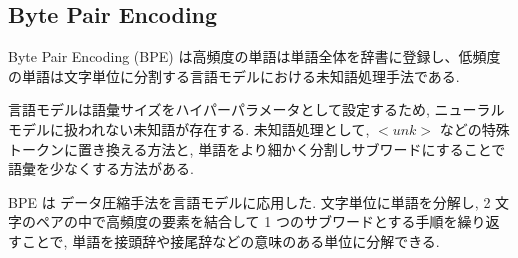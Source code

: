 \documentclass[twocolumn]{jarticle}     %
\begin{document}
\subsection{Byte Pair Encoding}
Byte Pair Encoding (BPE) は高頻度の単語は単語全体を辞書に登録し、低頻度の単語は文字単位に分割する言語モデルにおける未知語処理手法である.

言語モデルは語彙サイズをハイパーパラメータとして設定するため, ニューラルモデルに扱われない未知語が存在する.
未知語処理として, $<unk>$ などの特殊トークンに置き換える方法と, 単語をより細かく分割しサブワードにすることで語彙を少なくする方法がある.

BPE は
データ圧縮手法を言語モデルに応用した.
文字単位に単語を分解し, 2 文字のペアの中で高頻度の要素を結合して 1 つのサブワードとする手順を繰り返すことで,
単語を接頭辞や接尾辞などの意味のある単位に分解できる.


%

\end{document}
